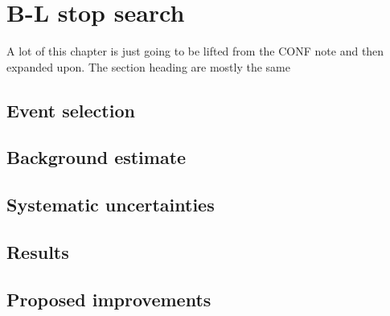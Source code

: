 \chapter[B-L stop search][B-L stop search]{B-L stop search}
\label{ch:bl_stop}

{\color{red}A lot of this chapter is just going to be lifted from the CONF note
  and then expanded upon. The section heading are mostly the same}

\section{Event selection}

\section{Background estimate}

\section{Systematic uncertainties}

\section{Results}

\section{Proposed improvements}

